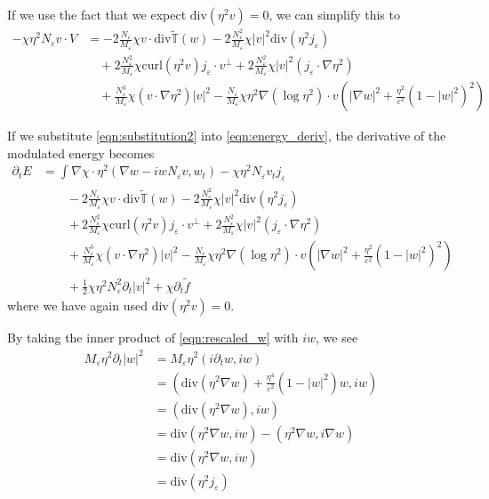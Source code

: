 \documentclass[a4paper]{article}
\newcommand{\curl}{\mathrm{curl}}
\renewcommand{\div}{\mathrm{div}}
\begin{document}
If we use the fact that we expect $\div ( \eta^2 v ) = 0$, we can simplify this to
\begin{align}
  - \chi \eta^2 N_\varepsilon v \cdot V &= -2 \frac{N_\varepsilon}{M_\varepsilon} \chi v \cdot \div \tilde{\mathbb{T}}(w) - 2
  \frac{N_\varepsilon^2}{M_\varepsilon} \chi |v|^2 \div ( \eta^2 j_\varepsilon ) \nonumber \\
  &\quad + 2 \frac{N_\varepsilon^2}{M_\varepsilon} \chi \curl(\eta^2 v) j_\varepsilon \cdot v^\perp + 2 \frac{N_\varepsilon^2}{M_\varepsilon} \chi
  |v|^2 (j_\varepsilon \cdot \nabla \eta^2) \nonumber \\
  &\quad + \frac{N_\varepsilon^3}{M_\varepsilon} \chi (v \cdot \nabla \eta^2) |v|^2 - \frac{N_\varepsilon}{M_\varepsilon} \chi \eta^2 \nabla( \log \eta^2 ) \cdot v \left( | \nabla w |^2 + \frac{\eta^2}{\varepsilon^2} (1-|w|^2)^2 \right)
  \label{eqn:substitution2}
\end{align}

If we substitute \eqref{eqn:substitution2} into \eqref{eqn:energy_deriv}, the derivative of the modulated energy becomes
\begin{align}
  \partial_t E &= \int_{}^{} \nabla \chi \cdot \eta^2 ( \nabla w - i w N_\varepsilon v, w_t) - \chi \eta^2 N_\varepsilon v_t j_\varepsilon \nonumber
  \\
  &\quad \quad -2 \frac{N_\varepsilon}{M_\varepsilon} \chi v \cdot \div \tilde{\mathbb{T}}(w) - 2
  \frac{N_\varepsilon^2}{M_\varepsilon} \chi |v|^2 \div ( \eta^2 j_\varepsilon ) \nonumber \\
  &\quad \quad+ 2 \frac{N_\varepsilon^2}{M_\varepsilon} \chi \curl(\eta^2 v) j_\varepsilon \cdot v^\perp + 2 \frac{N_\varepsilon^2}{M_\varepsilon} \chi
  |v|^2 (j_\varepsilon \cdot \nabla \eta^2) \nonumber \\
  &\quad \quad + \frac{N_\varepsilon^3}{M_\varepsilon} \chi (v \cdot \nabla \eta^2) |v|^2 - \frac{N_\varepsilon}{M_\varepsilon} \chi \eta^2 \nabla(
  \log \eta^2 ) \cdot v \left( | \nabla w |^2 + \frac{\eta^2}{\varepsilon^2} (1-|w|^2)^2 \right) \nonumber \\
  &\quad \quad + \frac{1}{2} \chi \eta^2 N_\varepsilon^2 \partial_t |v|^2 + \chi \partial_t \tilde{f}
  \label{eqn:deriv_energy}
\end{align}
where we have again used $\div(\eta^2 v) = 0$.

By taking the inner product of \eqref{eqn:rescaled_w} with $iw$, we see
\begin{align}
  M_\varepsilon \eta^2 \partial_t |w|^2 &= M_\varepsilon \eta^2 (i \partial_t w, iw) \nonumber \\
  &= ( \div ( \eta^2 \nabla w ) + \frac{\eta^4}{\varepsilon^2} (1-|w|^2)w, iw) \nonumber \\
  &= ( \div ( \eta^2 \nabla w ), iw ) \nonumber \\
  &= \div (\eta^2 \nabla w, iw) - ( \eta^2 \nabla w, i \nabla w ) \nonumber \\
  &= \div (\eta^2 \nabla w, iw) \nonumber \\
  &= \div (\eta^2 j_\varepsilon)
  \label{eqn:div_eta^2j}
\end{align}
\end{document}
